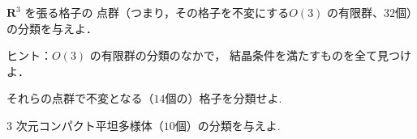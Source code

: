 \begin{Quiz}
$\mathbf R^3$ を張る格子の
点群（つまり，その格子を不変にする$O(3)$ の有限群、$32$個）の分類を与えよ．

ヒント：$O(3)$ の有限群の分類のなかで， 結晶条件を満たすものを全て見つけよ．
\end{Quiz}

\begin{Quiz}
それらの点群で不変となる（$14$個の）格子を分類せよ.
\end{Quiz}

\begin{Quiz}
$3$ 次元コンパクト平坦多様体（$10$個）の分類を与えよ.
\end{Quiz}

%
%
%
%
%
%
%

 



